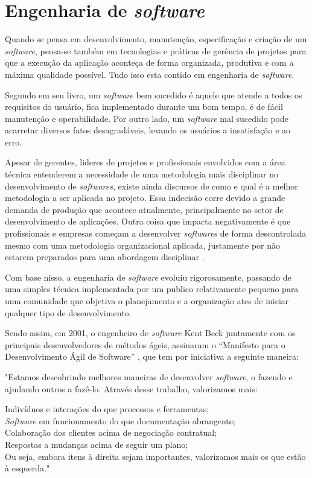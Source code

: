 \section{\textbf{{Engenharia de \textit{software}}}}
\label{engenharia-software}

Quando se pensa em desenvolvimento, manutenção, especificação e criação de um \textit{software}, pensa-se também em tecnologias e práticas de gerência de projetos para que a execução da aplicação aconteça de forma organizada, produtiva e com a máxima qualidade possível. Tudo isso esta contido em engenharia de \textit{software}.

Segundo  em seu livro, um \textit{software} bem sucedido é aquele que atende a todos os requisitos do usuário, fica implementado durante um bom tempo, é de fácil manutenção e operabilidade. Por outro lado, um \textit{software} mal sucedido pode acarretar diversos fatos desagradáveis, levando os usuários a insatisfação e ao erro. 

Apesar de gerentes, lideres de projetos e profissionais envolvidos com a área técnica entenderem a necessidade de uma metodologia mais disciplinar no desenvolvimento de \textit{softwares}, existe ainda discursos de como e qual é a melhor metodologia a ser aplicada no projeto. Essa indecisão corre devido a grande demanda de produção que acontece atualmente, principalmente no setor de desenvolvimento de aplicações. Outra coisa que impacta negativamente é que profissionais e empresas começam a desenvolver \textit{softwares} de forma descontrolada mesmo com uma metodologia organizacional aplicada, justamente por não estarem preparados para uma abordagem disciplinar \cite{PRESSMAN2016}. 

Com base nisso, a engenharia de \textit{software} evoluiu rigorosamente, passando de uma simples técnica implementada por um publico relativamente pequeno para uma comunidade que objetiva o planejamento e a organização ates de iniciar qualquer tipo de desenvolvimento.

Sendo assim, em 2001, o engenheiro de \textit{software} Kent Beck juntamente com os principais
desenvolvedores de métodos ágeis, assinaram o “Manifesto para o Desenvolvimento Ágil de Software” \cite{SOMMERVILLE2011}, que tem por iniciativa a seguinte maneira:

\begin{citacao}
"Estamos descobrindo melhores maneiras de desenvolver \textit{software}, o fazendo e ajudando outros a fazê-lo. Através desse trabalho, valorizamos mais:

Indivíduos e interações do que processos e ferramentas;\\
\textit{Software} em funcionamento do que documentação abrangente;\\
Colaboração dos clientes acima de negociação contratual;\\
Respostas a mudanças acima de seguir um plano;\\
Ou seja, embora itens à direita sejam importantes, valorizamos mais os que estão à esquerda.\cite{SOMMERVILLE2011}"
\end{citacao}



